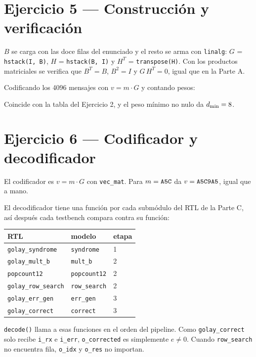 \documentclass[11pt,a4paper]{article}
\begin{document}
\section{Ejercicio 5 --- Construcción y verificación}

$B$ se carga con las doce filas del enunciado y el resto se arma con
\texttt{linalg}: $G$ = \texttt{hstack(I, B)}, $H$ = \texttt{hstack(B, I)}
y $H^T$ = \texttt{transpose(H)}. Con los productos matriciales se
verifica que $B^T=B$, $B^2=I$ y $G\,H^T=0$, igual que en la Parte A.

Codificando los 4096 mensajes con $v=m\cdot G$ y contando pesos:

\begin{center}\small

\end{center}

Coincide con la tabla del Ejercicio 2, y el peso mínimo no nulo da
$d_{\min}=8$.

\section{Ejercicio 6 --- Codificador y decodificador}

El codificador es $v=m\cdot G$ con \texttt{vec\_mat}. Para
$m=\texttt{A5C}$ da $v=\texttt{A5C9A5}$, igual que a mano.

El decodificador tiene una función por cada submódulo del RTL de la
Parte C, así después cada testbench compara contra su función:

\begin{center}\small
\begin{tabular}{@{}lll@{}}
\toprule
RTL & modelo & etapa \\
\midrule
\texttt{golay\_syndrome}    & \texttt{syndrome}   & 1 \\
\texttt{golay\_mult\_b}     & \texttt{mult\_b}     & 2 \\
\texttt{popcount12}         & \texttt{popcount12} & 2 \\
\texttt{golay\_row\_search} & \texttt{row\_search} & 2 \\
\texttt{golay\_err\_gen}    & \texttt{err\_gen}    & 3 \\
\texttt{golay\_correct}     & \texttt{correct}    & 3 \\
\bottomrule
\end{tabular}
\end{center}

\texttt{decode()} llama a esas funciones en el orden del pipeline.
Como \texttt{golay\_correct} solo recibe \texttt{i\_rx} e \texttt{i\_err},
\texttt{o\_corrected} es simplemente $e\neq 0$. Cuando
\texttt{row\_search} no encuentra fila, \texttt{o\_idx} y \texttt{o\_res}
no importan.
\end{document}
